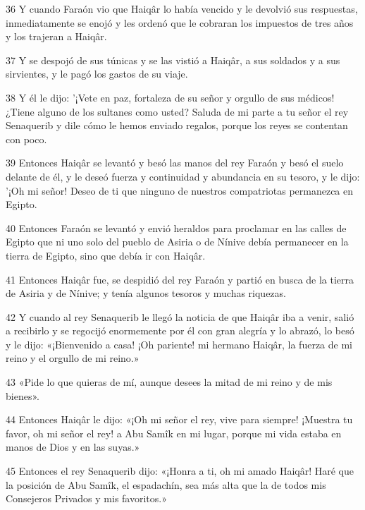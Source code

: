 \par 36 Y cuando Faraón vio que Haiqâr lo había vencido y le devolvió sus respuestas, inmediatamente se enojó y les ordenó que le cobraran los impuestos de tres años y los trajeran a Haiqâr.

\par 37 Y se despojó de sus túnicas y se las vistió a Haiqâr, a sus soldados y a sus sirvientes, y le pagó los gastos de su viaje.

\par 38 Y él le dijo: '¡Vete en paz, fortaleza de su señor y orgullo de sus médicos! ¿Tiene alguno de los sultanes como usted? Saluda de mi parte a tu señor el rey Senaquerib y dile cómo le hemos enviado regalos, porque los reyes se contentan con poco.

\par 39 Entonces Haiqâr se levantó y besó las manos del rey Faraón y besó el suelo delante de él, y le deseó fuerza y ​​continuidad y abundancia en su tesoro, y le dijo: '¡Oh mi señor! Deseo de ti que ninguno de nuestros compatriotas permanezca en Egipto.

\par 40 Entonces Faraón se levantó y envió heraldos para proclamar en las calles de Egipto que ni uno solo del pueblo de Asiria o de Nínive debía permanecer en la tierra de Egipto, sino que debía ir con Haiqâr.

\par 41 Entonces Haiqâr fue, se despidió del rey Faraón y partió en busca de la tierra de Asiria y de Nínive; y tenía algunos tesoros y muchas riquezas.

\par 42 Y cuando al rey Senaquerib le llegó la noticia de que Haiqâr iba a venir, salió a recibirlo y se regocijó enormemente por él con gran alegría y lo abrazó, lo besó y le dijo: «¡Bienvenido a casa! ¡Oh pariente! mi hermano Haiqâr, la fuerza de mi reino y el orgullo de mi reino.»

\par 43 «Pide lo que quieras de mí, aunque desees la mitad de mi reino y de mis bienes».

\par 44 Entonces Haiqâr le dijo: «¡Oh mi señor el rey, vive para siempre! ¡Muestra tu favor, oh mi señor el rey! a Abu Samîk en mi lugar, porque mi vida estaba en manos de Dios y en las suyas.»

\par 45 Entonces el rey Senaquerib dijo: «¡Honra a ti, oh mi amado Haiqâr! Haré que la posición de Abu Samîk, el espadachín, sea más alta que la de todos mis Consejeros Privados y mis favoritos.»

